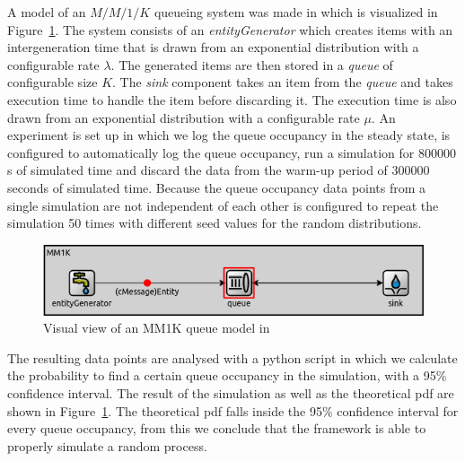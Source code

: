 A model of an $M/M/1/K$ queueing system was made in \omnet which is visualized in Figure~\ref{fig:mm1k_sim}. The system consists of an \textit{entityGenerator} which creates items with an intergeneration time that is drawn from an exponential distribution with a configurable rate $\lambda$. The generated items are then stored in a \textit{queue} of configurable size $K$. The \textit{sink} component takes an item from the \textit{queue} and takes execution time to handle the item before discarding it. The execution time is also drawn from an exponential distribution with a configurable rate $\mu$. An experiment is set up in which we log the queue occupancy in the steady state, \omnet is configured to automatically log the queue occupancy, run a simulation for 800000 s of simulated time and discard the data from the warm-up period of 300000 seconds of simulated time. Because the queue occupancy data points from a single simulation are not independent of each other \omnet is configured to repeat the simulation 50 times with different seed values for the random distributions.

\begin{figure}[htbp]
    \centering
    \includegraphics[width=\textwidth]{images/MM1K_sim.png}
    \caption{Visual view of an MM1K queue model in \omnet}
    \label{fig:mm1k_sim}
\end{figure}

The resulting data points are analysed with a python script in which we calculate the probability to find a certain queue occupancy in the simulation, with a 95\% confidence interval. The result of the simulation as well as the theoretical pdf are shown in Figure~\ref{fig:mm1k_sim}. The theoretical pdf falls inside the 95\% confidence interval for every queue occupancy, from this we conclude that the framework is able to properly simulate a random process.


